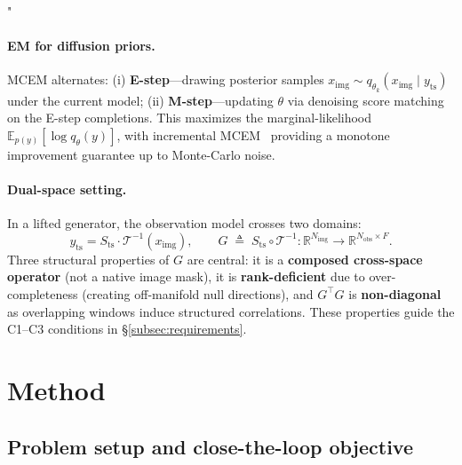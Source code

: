 "\documentclass{article}
\theoremstyle{plain}
\theoremstyle{definition}
\theoremstyle{remark}
\newcommand{\imgts}{\mathcal{T}^{-1}}
\newcommand{\Nimg}{N_{\mathrm{img}}}
\newcommand{\Nobs}{N_{\mathrm{obs}}}
\newcommand{\yts}{y_{\mathrm{ts}}}
\newcommand{\ximg}{x_{\mathrm{img}}}
\begin{document}
\paragraph{EM for diffusion priors.}
MCEM alternates: (i) \textbf{E-step}---drawing posterior samples $\ximg \sim q_{\theta_k}(\ximg \mid \yts)$ under the current model; (ii) \textbf{M-step}---updating $\theta$ via denoising score matching on the E-step completions. This maximizes the marginal-likelihood $\mathbb{E}_{p(y)}[\log q_\theta(y)]$, with incremental MCEM~\citep{neal1998em} providing a monotone improvement guarantee up to Monte-Carlo noise.

\paragraph{Dual-space setting.}
In a lifted generator, the observation model crosses two domains:
\begin{equation}
\yts = S_{\mathrm{ts}} \cdot \imgts(\ximg), \qquad G \;\triangleq\; S_{\mathrm{ts}} \circ \imgts : \mathbb{R}^{\Nimg} \to \mathbb{R}^{\Nobs \times F}.
\end{equation}
Three structural properties of $G$ are central: it is a \textbf{composed cross-space operator} (not a native image mask), it is \textbf{rank-deficient} due to over-completeness (creating off-manifold null directions), and $G^\top G$ is \textbf{non-diagonal} as overlapping windows induce structured correlations. These properties guide the C1--C3 conditions in \S\ref{subsec:requirements}.

\vspace{-2mm}
\section{Method}
\label{sec:method}
\vspace{-1mm}

\subsection{Problem setup and close-the-loop objective}
\label{sec:why-close}
\vspace{-1mm}
\end{document}

